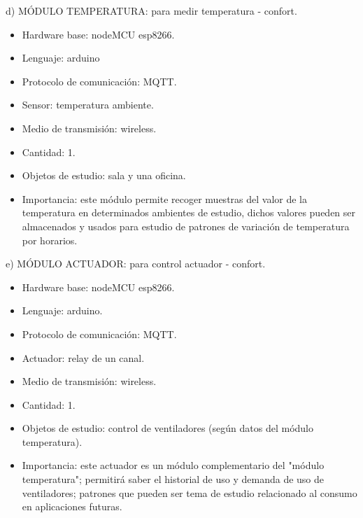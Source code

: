 \documentclass[11pt]{charter}
\begin{document}
d) MÓDULO TEMPERATURA: para medir temperatura - confort.
\begin{itemize}
\item Hardware base: nodeMCU esp8266.
\item Lenguaje: arduino
\item Protocolo de comunicación: MQTT.
\item Sensor: temperatura ambiente.
\item Medio de transmisión: wireless.
\item Cantidad: 1.
\item Objetos de estudio: sala y una oficina.
\item Importancia: este módulo permite recoger muestras del valor de la temperatura en determinados ambientes de estudio, dichos valores pueden ser almacenados y usados para estudio de patrones de variación de temperatura por horarios.
\end{itemize}

e) MÓDULO ACTUADOR: para control actuador - confort.
\begin{itemize}
\item Hardware base: nodeMCU esp8266.
\item Lenguaje: arduino.
\item Protocolo de comunicación: MQTT.
\item Actuador: relay de un canal.
\item Medio de transmisión: wireless.
\item Cantidad: 1.
\item Objetos de estudio: control de ventiladores (según datos del módulo temperatura).
\item Importancia: este actuador es un módulo complementario del "módulo temperatura"; permitirá saber el historial de uso y demanda de uso de ventiladores; patrones que pueden ser tema de estudio relacionado al consumo en aplicaciones futuras.
\end{itemize}
\end{document}
